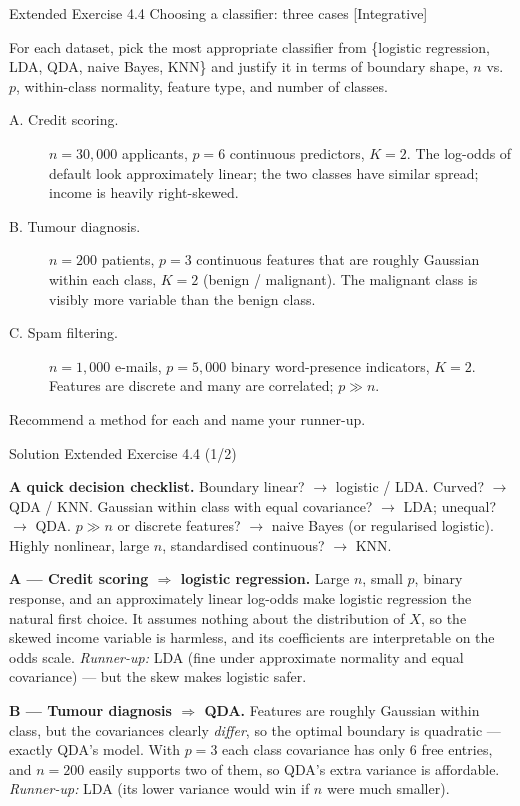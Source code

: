 \documentclass[aspectratio=169,11pt]{beamer}
\begin{document}
\begin{frame}{Extended Exercise 4.4 \textemdash{} Choosing a classifier: three cases [Integrative]}
\begin{longexercise}
For each dataset, pick the most appropriate classifier from
\{logistic regression, LDA, QDA, naive Bayes, KNN\} and justify it in
terms of boundary shape, $n$ vs.\ $p$, within-class normality, feature
type, and number of classes.
\begin{description}
  \item[A. Credit scoring.] $n=30{,}000$ applicants, $p=6$ continuous
        predictors, $K=2$. The log-odds of default look approximately
        linear; the two classes have similar spread; income is heavily
        right-skewed.
  \item[B. Tumour diagnosis.] $n=200$ patients, $p=3$ continuous features
        that are roughly Gaussian within each class, $K=2$
        (benign / malignant). The malignant class is visibly more
        variable than the benign class.
  \item[C. Spam filtering.] $n=1{,}000$ e-mails, $p=5{,}000$ binary
        word-presence indicators, $K=2$. Features are discrete and many
        are correlated; $p\gg n$.
\end{description}
Recommend a method for each and name your runner-up.
\end{longexercise}
\end{frame}

\begin{frame}{Solution \textemdash{} Extended Exercise 4.4 (1/2)}
\begin{solutionbox}
\textbf{A quick decision checklist.}
Boundary linear? $\to$ logistic / LDA. Curved? $\to$ QDA / KNN.
Gaussian within class with equal covariance? $\to$ LDA; unequal? $\to$
QDA. $p\gg n$ or discrete features? $\to$ naive Bayes (or regularised
logistic). Highly nonlinear, large $n$, standardised continuous? $\to$
KNN.

\vspace{1mm}
\textbf{A --- Credit scoring $\Rightarrow$ logistic regression.}
Large $n$, small $p$, binary response, and an approximately linear
log-odds make logistic regression the natural first choice. It assumes
nothing about the distribution of $X$, so the skewed income variable is
harmless, and its coefficients are interpretable on the odds scale.
\emph{Runner-up:} LDA (fine under approximate normality and equal
covariance) --- but the skew makes logistic safer.

\vspace{1mm}
\textbf{B --- Tumour diagnosis $\Rightarrow$ QDA.}
Features are roughly Gaussian within class, but the covariances clearly
\emph{differ}, so the optimal boundary is quadratic --- exactly QDA's
model. With $p=3$ each class covariance has only $6$ free entries, and
$n=200$ easily supports two of them, so QDA's extra variance is
affordable. \emph{Runner-up:} LDA (its lower variance would win if $n$
were much smaller).
\end{solutionbox}
\end{frame}
\end{document}

